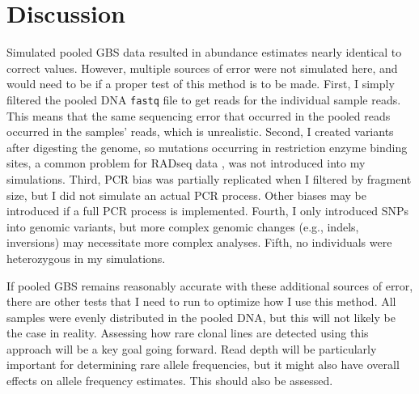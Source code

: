 
\section{Discussion}

Simulated pooled GBS data resulted in abundance estimates nearly identical to correct
values.
However, multiple sources of error were not simulated here, and would need to be if
a proper test of this method is to be made.
First, I simply filtered the pooled DNA \texttt{fastq} file to get reads for the 
individual sample reads. This means that the same sequencing error that occurred in 
the pooled reads occurred in the samples' reads, which is unrealistic.
Second, I created variants after digesting the genome, so mutations occurring in 
restriction enzyme binding sites, a common problem for RADseq data \citep{Andrews:2016bc},
was not introduced into my simulations.
Third, PCR bias was partially replicated when I filtered by fragment size, but
I did not simulate an actual PCR process. Other biases may be introduced if a full PCR
process is implemented.
Fourth, I only introduced SNPs into genomic variants, but more complex genomic 
changes (e.g., indels, inversions) may necessitate more complex analyses.
Fifth, no individuals were heterozygous in my simulations.

If pooled GBS remains reasonably accurate with these additional sources of error, there
are other tests that I need to run to optimize how I use this method.
All samples were evenly distributed in the pooled DNA, but this will not likely be
the case in reality. Assessing how rare clonal lines are detected using this approach 
will be a key goal going forward.
Read depth will be particularly important for determining rare allele frequencies, but
it might also have overall effects on allele frequency estimates.
This should also be assessed.
